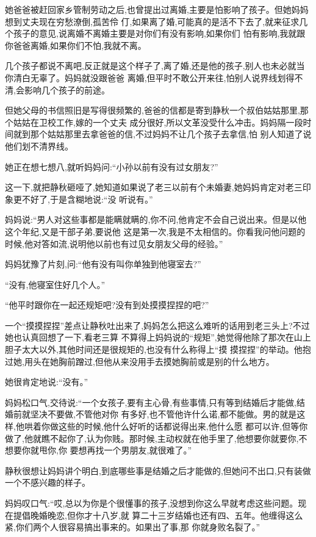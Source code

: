 ﻿\documentclass[12pt]{article}
\begin{document}
她爸爸被赶回家乡管制劳动之后,也曾提出过离婚,主要是怕影响了孩子。但她妈妈想到丈夫现在穷愁潦倒,孤苦伶
仃,如果离了婚,可能真的是活不下去了,就来征求几个孩子的意见,说离婚不离婚主要是对你们有没有影响,如果你们
怕有影响,我就跟你爸爸离婚,如果你们不怕,我就不离。

几个孩子都说不离吧,反正就是这个样子了,离了婚,还是他的孩子,别人也未必就当你清白无辜了。妈妈就没跟爸爸
离婚,但平时不敢公开来往,怕别人说界线划得不清,会影响几个孩子的前途。

但她父母的书信照旧是写得很频繁的,爸爸的信都是寄到静秋一个叔伯姑姑那里,那个姑姑在卫校工作,嫁的一个丈夫
成分很好,所以文革没受什么冲击。妈妈隔一段时间就到那个姑姑那里去拿爸爸的信,不过妈妈不让几个孩子去拿信,怕
别人知道了说他们划不清界线。

她正在想七想八,就听妈妈问:``小孙以前有没有过女朋友?''

这一下,就把静秋砸哑了,她知道如果说了老三以前有个未婚妻,她妈妈肯定对老三印象更不好了,于是含糊地说:``没
听说有。''

妈妈说:``男人对这些事都是能瞒就瞒的,你不问,他肯定不会自己说出来。但是以他这个年纪,又是干部子弟,要说他
这是第一次,我是不太相信的。你看我问他问题的时候,他对答如流,说明他以前也有过见女朋友父母的经验。''


妈妈犹豫了片刻,问:``他有没有叫你单独到他寝室去?''

``没有,他寝室住好几个人。''

``他平时跟你在一起\myrule 还\myrule 规矩吧?没有\myrule 到处\myrule 摸摸捏捏的吧?''

一个``摸摸捏捏''差点让静秋吐出来了,妈妈怎么把这么难听的话用到老三头上?不过她也认真回想了一下,看老三算
不算得上妈妈说的``规矩'',她觉得他除了那次在山上胆子太大以外,其他时间还是很规矩的,也没有什么称得上``摸
摸捏捏''的举动。他抱过她,用头在她胸前蹭过,但他从来没用手去摸她胸前或是别的什么地方。

她很肯定地说:``没有。''

妈妈松口气,交待说:``一个女孩子,要有主心骨,有些事情,只有等到结婚后才能做,结婚前就坚决不要做,不管他对你
有多好,也不管他许什么诺,都不能做。男的就是这样,他哄着你做这些的时候,他什么好听的话都说得出来,他什么愿
都可以许,但等你做了,他就瞧不起你了,认为你贱。那时候,主动权就在他手里了,他想要你就要你,不想要你就甩你,你
要想再找一个男朋友,就很难了。''

静秋很想让妈妈讲个明白,到底哪些事是结婚之后才能做的,但她问不出口,只有装做一个不感兴趣的样子。

妈妈叹口气:``哎,总以为你是个很懂事的孩子,没想到你这么早就考虑这些问题。现在提倡晚婚晚恋,但你才十八岁,就
算二十三岁结婚也还有四、五年。他缠得这么紧,你们两个人\myrule 很容易\myrule 搞出事来的。如果出了事,那
你就身败名裂了。''
\end{document}
